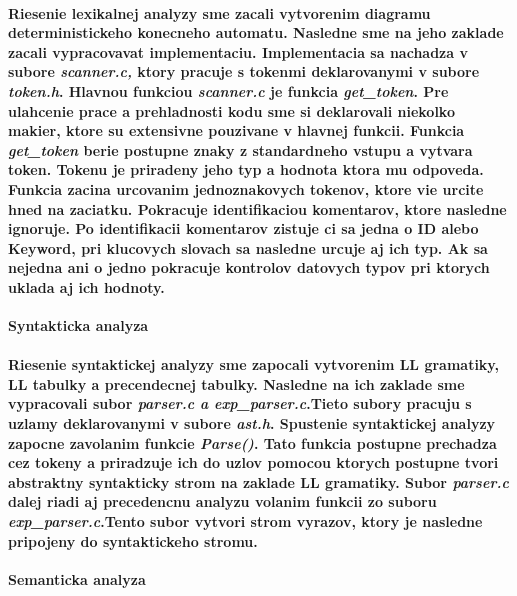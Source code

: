 \documentclass[12pt]{article}
\begin{document}
\paragraph{\indent Riesenie lexikalnej analyzy sme zacali vytvorenim diagramu deterministickeho konecneho automatu. Nasledne sme na jeho zaklade zacali vypracovavat implementaciu. Implementacia sa nachadza v subore \textit{scanner.c,} ktory pracuje s tokenmi deklarovanymi v subore \textit{token.h}. Hlavnou funkciou \textit{scanner.c} je funkcia \textit{get\_token}. Pre ulahcenie prace a prehladnosti kodu sme si deklarovali niekolko makier, ktore su extensivne pouzivane v hlavnej funkcii. Funkcia \textit{get\_token} berie postupne znaky z standardneho vstupu a vytvara token. Tokenu je priradeny jeho typ a hodnota ktora mu odpoveda. Funkcia zacina urcovanim jednoznakovych tokenov, ktore vie urcite hned na zaciatku. Pokracuje identifikaciou komentarov, ktore nasledne ignoruje. Po identifikacii komentarov zistuje ci sa jedna o ID alebo Keyword, pri klucovych slovach sa nasledne urcuje aj ich typ. Ak sa nejedna ani o jedno pokracuje kontrolov datovych typov pri ktorych uklada aj ich hodnoty.  \newline \\}

 \Large \textbf{Syntakticka analyza}\normalsize \\
\noindent\makebox[\linewidth]{\rule{\textwidth}{0.4pt}}

\paragraph{Riesenie syntaktickej analyzy sme zapocali vytvorenim LL gramatiky, LL tabulky a precendecnej tabulky. Nasledne na ich zaklade sme vypracovali subor \textit{parser.c a exp\_parser.c}.Tieto subory pracuju s uzlamy deklarovanymi v subore \textit{ast.h}. Spustenie syntaktickej analyzy zapocne zavolanim funkcie \textit{Parse()}. Tato funkcia postupne prechadza cez tokeny a priradzuje ich do uzlov pomocou ktorych postupne tvori abstraktny syntakticky strom na zaklade LL gramatiky. Subor \textit{parser.c} dalej riadi aj precedencnu analyzu volanim funkcii zo suboru \textit{exp\_parser.c}.Tento subor vytvori strom vyrazov, ktory je nasledne pripojeny do syntaktickeho stromu.  \newline \\}

 \Large \textbf{Semanticka analyza}\normalsize \\
\noindent\makebox[\linewidth]{\rule{\textwidth}{0.4pt}}
\end{document}
